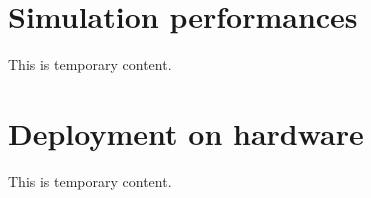 \section{Simulation performances}
This is temporary content.

\section{Deployment on hardware}
This is temporary content.
